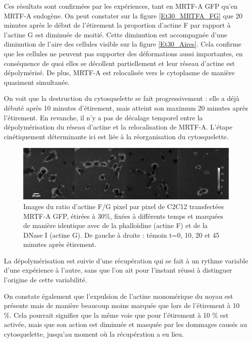 Ces résultats sont confirmées par les expériences, tant en MRTF-A GFP qu'en MRTF-A endogène. On peut constater sur la figure \ref{Et30_MRTFA_FG} que 20 minutes après le début de l'étirement la proportion d'actine F par rapport à l'actine G est diminuée de moitié. Cette diminution est accompagnée d'une diminution de l'aire des cellules visible sur la figure \ref{Et30_Aires}. Cela confirme que les cellules ne peuvent pas supporter des déformations aussi importantes, en conséquence de quoi elles se décollent partiellement et leur réseau d'actine est dépolymérisé. 
De plus, MRTF-A est relocalisée vers le cytoplasme de manière quasiment simultanée. 

On voit que la destruction du cytosquelette se fait progressivement : elle a déjà débuté après 10 minutes d'étirement, mais atteint son maximum 20 minutes après l'étirement. En revanche, il n'y a pas de décalage temporel entre la dépolymérisation du réseau d'actine et la relocalisation de MRTF-A. L'étape cinétiquement déterminante ici est liée à la réorganisation du cytosquelette. 

\begin{figure}
\includegraphics[scale=0.35]{Figures/Images_FG_Et30.png} 
\caption{\label{image_fg} Images du ratio d'actine F/G pixel par pixel de C2C12 transfectées MRTF-A GFP, étirées à 30\%, fixées à différents temps et marquées de manière identique avec de la phalloïdine (actine F) et de la DNase I (actine G). De gauche à droite : témoin t=0, 10, 20 et 45 minutes après étirement.}

\end{figure}
La dépolymérisation est suivie d'une récupération qui se fait à un rythme variable d'une expérience à l'autre, sans que l'on ait pour l'instant réussi à distinguer l'origine de cette variabilité. 

On constate également que l'expulsion de l'actine monomérique du noyau est présente mais de manière beaucoup moins marquée que lors de l'étirement à 10 \%. Cela pourrait signifier que la même voie que pour l'étirement à 10 \% est activée, mais que son action est diminuée et masquée par les dommages causés au cytosquelette, jusqu'au moment où la récupération a eu lieu. 


